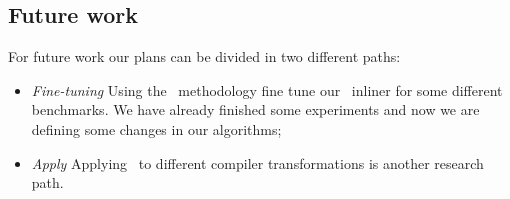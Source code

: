 \subsection{Future work}

For future work our plans can be divided in two different paths:
\begin{itemize}
\item {\it Fine-tuning} Using the \CP\ methodology fine tune our \FDI\ inliner for some different benchmarks. We have already finished some experiments and now we are defining some changes in our algorithms;

\item {\it Apply \CP}  Applying \CP\ to different compiler transformations is another research path.

\end{itemize}
